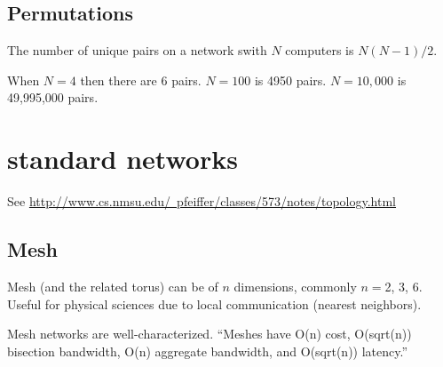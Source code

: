 \documentclass[pdftex]{article}
\begin{document}
\subsection{Permutations}

The number of unique pairs on a network swith $N$ computers is $N(N-1)/2$. 

When $N=4$ then there are 6 pairs. $N=100$ is 4950 pairs. $N=10,000$ is 49,995,000 pairs.

\section{standard networks}

See \href{http://www.cs.nmsu.edu/~pfeiffer/classes/573/notes/topology.html}{http://www.cs.nmsu.edu/~pfeiffer/classes/573/notes/topology.html}

\subsection{Mesh}
Mesh (and the related torus) can be of $n$ dimensions, commonly $n=$2, 3, 6. Useful for physical sciences due to local communication (nearest neighbors).

Mesh networks are well-characterized. ``Meshes have O(n) cost, O(sqrt(n)) bisection bandwidth, O(n) aggregate bandwidth, and O(sqrt(n)) latency.''
\end{document}
